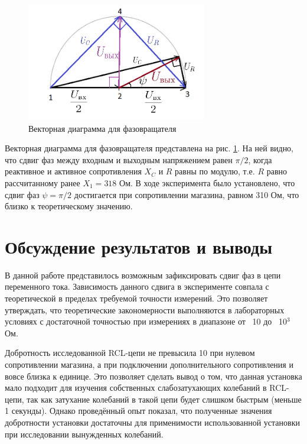 \documentclass[a4paper,12pt]{article} %
\begin{document}
\begin{figure}
    \centering
    \includegraphics[width = 0.7\textwidth]{diagram.png}
    \caption{Векторная диаграмма для фазовращателя}
    \label{fig:diagram}
\end{figure}

Векторная диаграмма для фазовращателя представлена на рис. \ref{fig:diagram}. На ней видно, что сдвиг фаз между входным и выходным напряжением равен $\pi/2$, когда реактивное и активное сопротивления $X_C$ и $R$ равны по модулю, т.е. $R$ равно рассчитанному ранее $X_1 = 318$ Ом. В ходе эксперимента было установлено, что сдвиг фаз $\psi = \pi/2$ достигается при сопротивлении магазина, равном 310 Ом, что близко к теоретическому значению.

\section{Обсуждение результатов и выводы}

В данной работе представилось возможным зафиксировать сдвиг фаз в цепи переменного тока. Зависимость данного сдвига в эксперименте совпала с теоретической в пределах требуемой точности измерений. Это позволяет утверждать, что теоретические закономерности выполняются в лабораторных условиях с достаточной точностью при измерениях в диапазоне от ~10 до ~10$^3$ Ом.

Добротность исследованной RCL-цепи не превысила 10 при нулевом сопротивлении магазина, а при подключении дополнительного сопротивления и вовсе близка к единице. Это позволяет сделать вывод о том, что данная установка мало подходит для изучения собственных слабозатухающих колебаний в RCL-цепи, так как затухание колебаний в такой цепи будет слишком быстрым (меньше 1 секунды). Однако проведённый опыт показал, что полученные значения добротности установки достаточны для применимости использованной установки при исследовании вынужденных колебаний.
\end{document}
